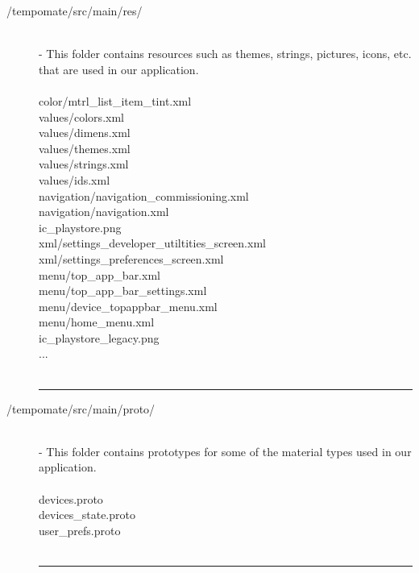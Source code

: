 \begin{enumerate}[label=\alph*]
\begin{description}
    \item[/tempomate/src/main/res/] \hfill \\
    \small
    - This folder contains resources such as themes, strings, pictures, icons, etc. that are used in our application.\\\\
    \footnotesize
        color/mtrl\_list\_item\_tint.xml  \\
        values/colors.xml  \\
        values/dimens.xml  \\
        values/themes.xml  \\
        values/strings.xml  \\
        values/ids.xml  \\
        navigation/navigation\_commissioning.xml  \\
        navigation/navigation.xml  \\
        ic\_playstore.png  \\
        xml/settings\_developer\_utiltities\_screen.xml  \\
        xml/settings\_preferences\_screen.xml  \\
        menu/top\_app\_bar.xml  \\
        menu/top\_app\_bar\_settings.xml  \\
        menu/device\_topappbar\_menu.xml  \\
        menu/home\_menu.xml  \\
        ic\_playstore\_legacy.png  \\
        ... \\\\

            \vspace{-0.2cm}
      \hrule
      \vspace{0.2cm}
      
    \item[/tempomate/src/main/proto/] \hfill \\
    \small
    - This folder contains prototypes for some of the material types used in our application.\\\\
    \footnotesize
        devices.proto  \\
        devices\_state.proto  \\
        user\_prefs.proto  \\\\

            \vspace{-0.2cm}
      \hrule
      \vspace{0.2cm}
      

\end{description}
\end{enumerate}
